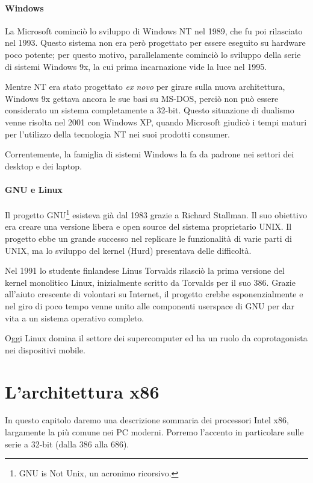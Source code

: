 \documentclass[12pt,a4paper]{report}
\begin{document}
			\subsubsection{Windows}
				La Microsoft cominciò lo sviluppo di Windows NT nel 1989, che fu poi rilasciato nel 1993. Questo sistema non era però
				progettato per essere eseguito su hardware poco potente; per questo motivo, parallelamente cominciò lo sviluppo della
				serie di sistemi Windows 9x, la cui prima incarnazione vide la luce nel 1995.
			
				Mentre NT era stato progettato \emph{ex novo} per girare sulla nuova architettura, Windows 9x gettava ancora le sue basi su MS-DOS,
				perciò non può essere considerato un sistema completamente a 32-bit.
				Questo situazione di dualismo venne risolta nel 2001 con Windows XP, quando Microsoft giudicò i tempi
				maturi per l'utilizzo della tecnologia NT nei suoi prodotti consumer.
				
				Correntemente, la famiglia di sistemi Windows la fa da padrone nei settori dei desktop e dei laptop.
				
			\subsubsection{GNU e Linux}
				Il progetto GNU\footnote{GNU is Not Unix, un acronimo ricorsivo.} esisteva già dal 1983 grazie a Richard Stallman. Il suo obiettivo
				era creare una versione libera e open source del sistema proprietario UNIX.
				Il progetto ebbe un grande successo nel replicare le funzionalità di varie parti di UNIX, ma lo sviluppo del kernel (Hurd) presentava
				delle difficoltà.
				
				Nel 1991 lo studente finlandese Linus Torvalds rilasciò la prima versione del kernel monolitico Linux, inizialmente scritto
				da Torvalds per il suo 386. Grazie all'aiuto crescente di volontari su Internet, il progetto crebbe esponenzialmente e
				nel giro di poco tempo venne unito alle componenti userspace di GNU per dar vita a un sistema operativo completo.
				
				Oggi Linux domina il settore dei supercomputer ed ha un ruolo da coprotagonista nei dispositivi mobile.
			
\chapter{L'architettura x86}
	In questo capitolo daremo una descrizione sommaria dei processori Intel x86, largamente la più comune nei PC moderni.
	Porremo l'accento in particolare sulle serie a 32-bit (dalla 386 alla 686).
	
\end{document}
